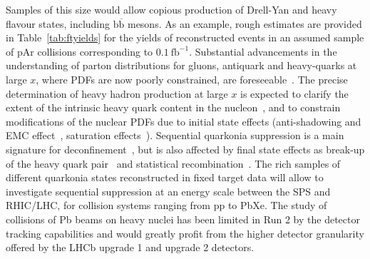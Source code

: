 \documentclass[../report.tex]{subfiles}
\begin{document}
Samples of this size would allow copious production of Drell-Yan
and heavy flavour states, including $\textrm{b}\overline{\textrm{b}}$ mesons.
As an example, rough estimates are provided in
Table~\ref{tab:ftyields} for the yields of reconstructed events in an assumed sample of pAr collisions corresponding to $0.1~\textrm{fb}^{-1}$.
Substantial advancements in the understanding of parton
distributions for gluons, antiquark and heavy-quarks 
at large $x$, where PDFs are now poorly constrained, are
foreseeable~\cite{after,Hadjidakis:2018ifr}. The precise determination
of heavy hadron production at large $x$ is expected to clarify
the  extent of the intrinsic heavy quark content
in the nucleon~\cite{Brodsky:1980pb,Brodsky:2015fna}, and to constrain
modifications of the nuclear PDFs due to initial state effects
(anti-shadowing and EMC effect~\cite{Geesaman:1995yd}, saturation
effects~\cite{Albacete:2014fwa}).
Sequential quarkonia suppression is a main signature for
deconfinement~\cite{Matsui:1986dk}, but is also affected by final
state effects as break-up of the heavy quark  pair~\cite{Vogt:2001ky}
and statistical recombination~\cite{BraunMunzinger:2000px}.
The rich samples of  different quarkonia states reconstructed 
in fixed target data will allow to
investigate sequential suppression at an energy scale
between the SPS and RHIC/LHC, for 
collision systems ranging from pp to PbXe.
The study of collisions of Pb beams on heavy nuclei has been 
limited in Run 2  by the detector tracking capabilities and would
greatly profit from the higher detector granularity offered by the 
LHCb upgrade 1 and upgrade 2 detectors.
\end{document}
